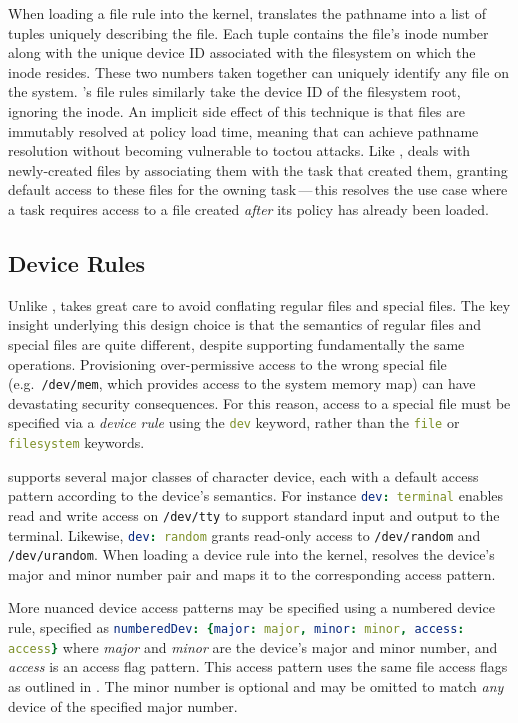When loading a file rule into the kernel, \bpfcontain{} translates the pathname into
a list of tuples uniquely describing the file. Each tuple contains the file's inode number
along with the unique device ID associated with the filesystem on which the inode resides.
These two numbers taken together can uniquely identify any file on the system.
\bpfcontain{}'s file rules similarly take the device ID of the filesystem root, ignoring
the inode. An implicit side effect of this technique is that files are immutably resolved
at policy load time, meaning that \bpfcontain{} can achieve pathname resolution without
becoming vulnerable to \gls{toctou} attacks. Like \bpfbox{}, \bpfcontain{} deals with
newly-created files by associating them with the task that created them, granting default
access to these files for the owning task\,---\,this resolves the use case where a task
requires access to a file created \textit{after} its policy has already been loaded.

\subsection{Device Rules}

Unlike \bpfbox{}, \bpfcontain{} takes great care to avoid conflating regular files and
special files. The key insight underlying this design choice is that the semantics of
regular files and special files are quite different, despite supporting fundamentally the
same operations. Provisioning over-permissive access to the wrong special file
(e.g.~\texttt{/dev/mem}, which provides access to the system memory map) can have
devastating security consequences. For this reason, access to a special file must be
specified via a \textit{device rule} using the \lstinline[language=yaml]|dev| keyword,
rather than the \lstinline[language=yaml]|file| or \lstinline[language=yaml]|filesystem|
keywords.

\bpfcontain{} supports several major classes of character device, each with a default
access pattern according to the device's semantics.  For instance
\lstinline[language=yaml]|dev: terminal| enables read and write access on
\texttt{/dev/tty} to support standard input and output to the terminal. Likewise,
\lstinline[language=yaml]|dev: random| grants read-only access to \texttt{/dev/random} and
\texttt{/dev/urandom}. When loading a device rule into the kernel, \bpfcontain{} resolves
the device's major and minor number pair and maps it to the corresponding access pattern.

More nuanced device access patterns may be specified using a numbered device rule,
specified as \lstinline[language=yaml]|numberedDev: {major: major, minor: minor, access: access}|
where \textit{major} and \textit{minor} are the device's major and minor number, and
\textit{access} is an access flag pattern. This access pattern uses the same file access
flags as outlined in . The minor number is optional and
may be omitted to match \textit{any} device of the specified major number.

